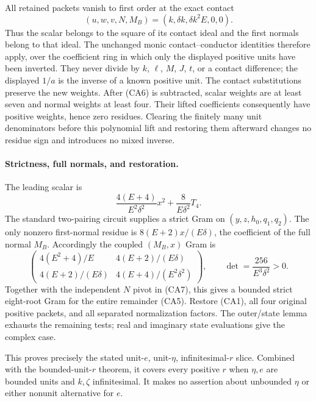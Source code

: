 All retained packets vanish to first order at the exact contact
\[ (u,w,v,N,M_B)=(k,\delta k,\delta k^2E,0,0). \]
Thus the scalar belongs to the square of its contact ideal and the
first normals belong to that ideal. The unchanged monic
contact--conductor identities therefore apply, over the coefficient
ring in which only the displayed positive units have been inverted.
They never divide by $k$, $\ell$, $M$, $J$, $t$, or a contact difference;
the displayed $1/a$ is the inverse of a known positive unit.
The contact substitutions preserve the new weights. After (CA6) is
subtracted, scalar weights are at least seven and normal weights at
least four. Their lifted coefficients consequently have positive
weights, hence zero residues. Clearing the finitely many unit
denominators before this polynomial lift and restoring them afterward
changes no residue sign and introduces no mixed inverse.

\paragraph{Strictness, full normals, and restoration.}
The leading scalar is
\[
 \frac{4(E+4)}{E^2\delta^2}x^2+\frac8{E\delta^2}T_4.
\]
The standard two-pairing circuit supplies a strict Gram on
$(y,z,h_0,q_1,q_2)$. The only nonzero first-normal residue is
$8(E+2)x/(E\delta)$, the coefficient of the full normal $M_B$.
Accordingly the coupled $(M_B,x)$ Gram is
\[
 \begin{pmatrix}
 4(E^2+4)/E&4(E+2)/(E\delta)\\
 4(E+2)/(E\delta)&4(E+4)/(E^2\delta^2)
 \end{pmatrix},\qquad
 \det=\frac{256}{E^3\delta^2}>0.                      \tag{CA8}
\]
Together with the independent $N$ pivot in (CA7), this gives a
bounded strict eight-root Gram for the entire remainder (CA5).
Restore (CA1), all four original positive packets, and all separated
normalization factors. The outer/state lemma exhausts the remaining
tests; real and imaginary state evaluations give the complex case.

This proves precisely the stated unit-$e$, unit-$\eta$,
infinitesimal-$r$ slice. Combined with the bounded-unit-$r$ theorem,
it covers every positive $r$ when $\eta,e$ are bounded units and
$k,\zeta$ infinitesimal. It makes no assertion about unbounded
$\eta$ or either nonunit alternative for $e$.
